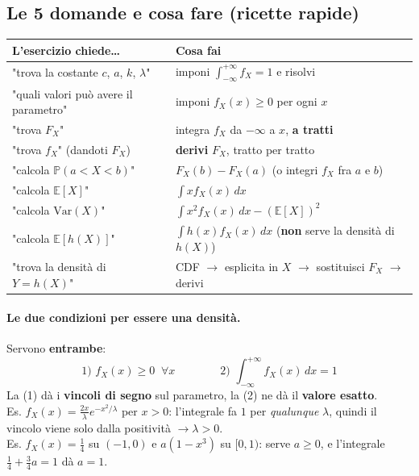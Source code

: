 \documentclass[12pt]{extarticle} %
\begin{document}
\subsection{Le 5 domande e cosa fare (ricette rapide)}
\begin{center}
\renewcommand{\arraystretch}{1.7}
\begin{tabular}{|l|l|}
\hline
\textbf{L'esercizio chiede\dots} & \textbf{Cosa fai} \\ \hline
"trova la costante $c$, $a$, $k$, $\lambda$" & imponi $\int_{-\infty}^{+\infty} f_X = 1$ e risolvi \\ \hline
"quali valori può avere il parametro" & imponi $f_X(x) \ge 0$ per ogni $x$ \\ \hline
"trova $F_X$" & integra $f_X$ da $-\infty$ a $x$, \textbf{a tratti} \\ \hline
"trova $f_X$" (dandoti $F_X$) & \textbf{derivi} $F_X$, tratto per tratto \\ \hline
"calcola $\mathbb{P}(a<X<b)$" & $F_X(b) - F_X(a)$ (o integri $f_X$ fra $a$ e $b$) \\ \hline
"calcola $\mathbb{E}[X]$" & $\int x f_X(x)\,dx$ \\ \hline
"calcola $\mathrm{Var}(X)$" & $\int x^2 f_X(x)\,dx - (\mathbb{E}[X])^2$ \\ \hline
"calcola $\mathbb{E}[h(X)]$" & $\int h(x) f_X(x)\,dx$ \; (\textbf{non} serve la densità di $h(X)$) \\ \hline
"trova la densità di $Y = h(X)$" & CDF $\to$ esplicita in $X$ $\to$ sostituisci $F_X$ $\to$ derivi \\ \hline
\end{tabular}
\end{center}

\paragraph{Le due condizioni per essere una densità.} Servono \textbf{entrambe}:
$$ \text{1) } f_X(x) \ge 0 \;\; \forall x \qquad\qquad \text{2) } \int_{-\infty}^{+\infty} f_X(x)\,dx = 1 $$
{\footnotesize La (1) dà i \textbf{vincoli di segno} sul parametro, la (2) ne dà il \textbf{valore esatto}. \\
Es. $f_X(x) = \frac{2x}{\lambda}e^{-x^2/\lambda}$ per $x>0$: l'integrale fa $1$ per \emph{qualunque} $\lambda$, quindi il vincolo viene solo dalla positività $\to \boxed{\lambda > 0}$. \\
Es. $f_X(x) = \frac14$ su $(-1,0)$ e $a(1-x^3)$ su $[0,1)$: serve $a \ge 0$, e l'integrale $\frac14 + \frac34 a = 1$ dà $a = 1$.}
\end{document}
